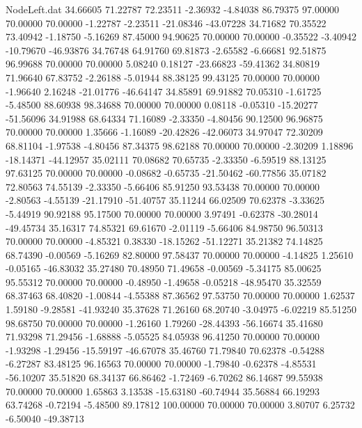 \begin{filecontents}{NodeLeft.dat}
  34.66605   71.22787   72.23511    -2.36932   -4.84038   86.79375   97.00000   70.00000   70.00000   -1.22787   -2.23511  -21.08346  -43.07228
  34.71682   70.35522   73.40942    -1.18750   -5.16269   87.45000   94.90625   70.00000   70.00000   -0.35522   -3.40942  -10.79670  -46.93876
  34.76748   64.91760   69.81873    -2.65582   -6.66681   92.51875   96.99688   70.00000   70.00000    5.08240    0.18127  -23.66823  -59.41362
  34.80819   71.96640   67.83752    -2.26188   -5.01944   88.38125   99.43125   70.00000   70.00000   -1.96640    2.16248  -21.01776  -46.64147
  34.85891   69.91882   70.05310    -1.61725   -5.48500   88.60938   98.34688   70.00000   70.00000    0.08118   -0.05310  -15.20277  -51.56096
  34.91988   68.64334   71.16089    -2.33350   -4.80456   90.12500   96.96875   70.00000   70.00000    1.35666   -1.16089  -20.42826  -42.06073
  34.97047   72.30209   68.81104    -1.97538   -4.80456   87.34375   98.62188   70.00000   70.00000   -2.30209    1.18896  -18.14371  -44.12957
  35.02111   70.08682   70.65735    -2.33350   -6.59519   88.13125   97.63125   70.00000   70.00000   -0.08682   -0.65735  -21.50462  -60.77856
  35.07182   72.80563   74.55139    -2.33350   -5.66406   85.91250   93.53438   70.00000   70.00000   -2.80563   -4.55139  -21.17910  -51.40757
  35.11244   66.02509   70.62378    -3.33625   -5.44919   90.92188   95.17500   70.00000   70.00000    3.97491   -0.62378  -30.28014  -49.45734
  35.16317   74.85321   69.61670    -2.01119   -5.66406   84.98750   96.50313   70.00000   70.00000   -4.85321    0.38330  -18.15262  -51.12271
  35.21382   74.14825   68.74390    -0.00569   -5.16269   82.80000   97.58437   70.00000   70.00000   -4.14825    1.25610   -0.05165  -46.83032
  35.27480   70.48950   71.49658    -0.00569   -5.34175   85.00625   95.55312   70.00000   70.00000   -0.48950   -1.49658   -0.05218  -48.95470
  35.32559   68.37463   68.40820    -1.00844   -4.55388   87.36562   97.53750   70.00000   70.00000    1.62537    1.59180   -9.28581  -41.93240
  35.37628   71.26160   68.20740    -3.04975   -6.02219   85.51250   98.68750   70.00000   70.00000   -1.26160    1.79260  -28.44393  -56.16674
  35.41680   71.93298   71.29456    -1.68888   -5.05525   84.05938   96.41250   70.00000   70.00000   -1.93298   -1.29456  -15.59197  -46.67078
  35.46760   71.79840   70.62378    -0.54288   -6.27287   83.48125   96.16563   70.00000   70.00000   -1.79840   -0.62378   -4.85531  -56.10207
  35.51820   68.34137   66.86462    -1.72469   -6.70262   86.14687   99.55938   70.00000   70.00000    1.65863    3.13538  -15.63180  -60.74944
  35.56884   66.19293   63.74268    -0.72194   -5.48500   89.17812  100.00000   70.00000   70.00000    3.80707    6.25732   -6.50040  -49.38713

\end{filecontents}
